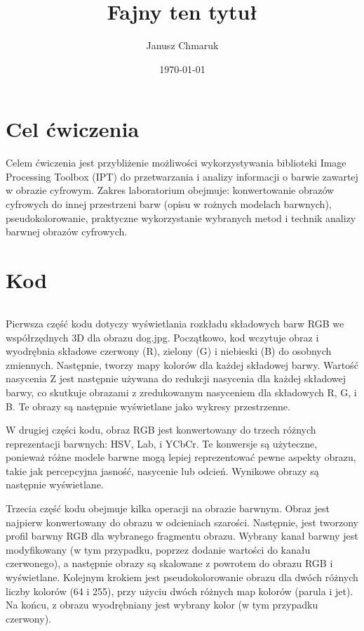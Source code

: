 \documentclass[10pt,a4paper,twoside,twocolumn]{article}%
\title{Fajny ten tytuł}%
\date{\today}%
\author{Janusz Chmaruk}%
\newenvironment{longlisting}{\captionsetup{type=listing}}{}
\begin{document}



\null%

\clearpage%

\tableofcontents%

\section{Cel ćwiczenia}%
Celem ćwiczenia jest przybliżenie możliwości wykorzystywania biblioteki Image Processing Toolbox (IPT) do przetwarzania i analizy informacji o barwie zawartej w obrazie cyfrowym. Zakres laboratorium obejmuje: konwertowanie obrazów cyfrowych do innej przestrzeni barw (opisu w rożnych modelach barwnych), pseudokolorowanie, praktyczne wykorzystanie wybranych metod i technik analizy barwnej obrazów cyfrowych.


\section{Kod}
\begin{longlisting}
    \inputminted{matlab}{kod/PSIO3x.m}
\end{longlisting}


Pierwsza część kodu dotyczy wyświetlania rozkładu składowych barw RGB we współrzędnych 3D dla obrazu dog.jpg. Początkowo, kod wczytuje obraz i wyodrębnia składowe czerwony (R), zielony (G) i niebieski (B) do osobnych zmiennych. Następnie, tworzy mapy kolorów dla każdej składowej barwy. Wartość nasycenia Z jest następnie używana do redukcji nasycenia dla każdej składowej barwy, co skutkuje obrazami z zredukowanym nasyceniem dla składowych R, G, i B\@. Te obrazy są następnie wyświetlane jako wykresy przestrzenne. 

W drugiej części kodu, obraz RGB jest konwertowany do trzech różnych reprezentacji barwnych: HSV, Lab, i YCbCr. Te konwersje są użyteczne, ponieważ różne modele barwne mogą lepiej reprezentować pewne aspekty obrazu, takie jak percepcyjna jasność, nasycenie lub odcień. Wynikowe obrazy są następnie wyświetlane. 

Trzecia część kodu obejmuje kilka operacji na obrazie barwnym. Obraz jest najpierw konwertowany do obrazu w odcieniach szarości. Następnie, jest tworzony profil barwny RGB dla wybranego fragmentu obrazu. Wybrany kanał barwny jest modyfikowany (w tym przypadku, poprzez dodanie wartości do kanału czerwonego), a następnie obrazy są skalowane z powrotem do obrazu RGB i wyświetlane. Kolejnym krokiem jest pseudokolorowanie obrazu dla dwóch różnych liczby kolorów (64 i 255), przy użyciu dwóch różnych map kolorów (parula i jet). Na końcu, z obrazu wyodrębniany jest wybrany kolor (w tym przypadku czerwony). 
\end{document}
